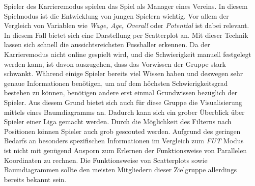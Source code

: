 \documentclass[usegeometry=true]{scrartcl}
\begin{document}
Spieler des Karrieremodus spielen das Spiel als Manager eines Vereins. In diesem Spielmodus ist die Entwicklung von jungen Spielern wichtig. Vor allem der Vergleich von Variablen wie \textit{Wage, Age, Overall} oder \textit{Potential} ist dabei relevant. In diesem Fall bietet sich eine Darstellung per Scatterplot an. Mit dieser Technik lassen sich schnell die aussichtsreichsten Fussballer erkennen. Da der Karrieremodus nicht online gespielt wird, und die Schwierigkeit manuell festgelegt werden kann, ist davon auszugehen, dass das Vorwissen der Gruppe stark schwankt. Während einige Spieler bereits viel Wissen haben und deswegen sehr genaue Informationen benötigen, um auf dem höchsten Schwierigkeitsgrad bestehen zu können, benötigen andere erst einmal Grundwissen bezüglich der Spieler. Aus diesem Grund bietet sich auch für diese Gruppe die Visualisierung mittels eines Baumdiagramms an. Dadurch kann sich ein grober Überblick über Spieler einer Liga gemacht werden. Durch die Möglichkeit des Filterns nach Positionen können Spieler auch grob gescouted werden. Aufgrund des geringen Bedarfs an besonders spezifischen Informationen im Vergleich zum \textit{FUT} Modus ist nicht mit genügend Ansporn zum Erlernen der Funktionsweise von Parallelen Koordinaten zu rechnen. Die Funktionsweise von Scatterplots sowie Baumdiagrammen sollte den meisten Mitgliedern dieser Zielgruppe allerdings bereits bekannt sein.\\
\end{document}
